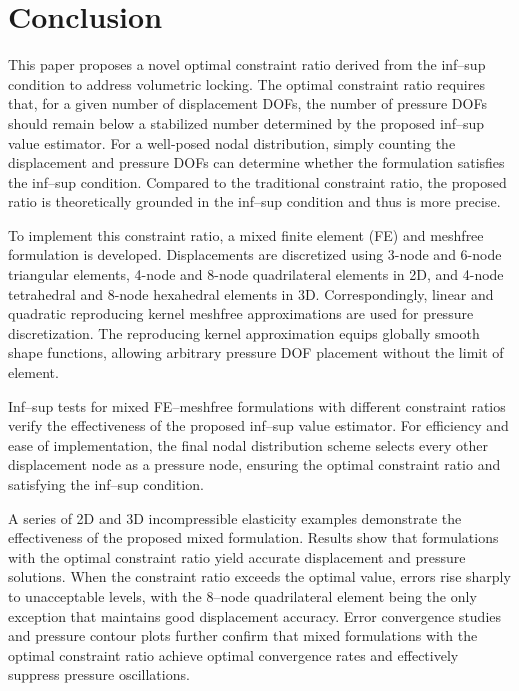 \section{Conclusion}

This paper proposes a novel optimal constraint ratio derived from the inf--sup condition to address volumetric locking. The optimal constraint ratio requires that, for a given number of displacement DOFs, the number of pressure DOFs should remain below a stabilized number determined by the proposed inf--sup value estimator. For a well-posed nodal distribution, simply counting the displacement and pressure DOFs can determine whether the formulation satisfies the inf--sup condition. Compared to the traditional constraint ratio, the proposed ratio is theoretically grounded in the inf--sup condition and thus is more precise\DIFaddbegin {}\DIFaddend .

To implement this constraint ratio, a mixed finite element (FE) and meshfree formulation is developed. Displacements are discretized using 3-node and 6-node triangular elements, 4-node and 8-node quadrilateral elements in 2D, and 4-node tetrahedral and 8-node hexahedral elements in 3D. Correspondingly, linear and quadratic reproducing kernel meshfree approximations are used for pressure discretization. The reproducing kernel approximation equips globally smooth shape functions, allowing arbitrary pressure DOF placement without the limit of element\DIFaddbegin {}\DIFaddend .

Inf--sup tests for mixed FE--meshfree formulations with different constraint ratios verify the effectiveness of the proposed inf--sup value estimator. For efficiency and ease of implementation, the final nodal distribution scheme selects every other displacement node as a pressure node, ensuring the optimal constraint ratio and satisfying the inf--sup condition.

A series of 2D and 3D incompressible elasticity examples demonstrate the effectiveness of the proposed mixed formulation. Results show that formulations with the optimal constraint ratio yield accurate displacement and pressure solutions. When the constraint ratio exceeds the optimal value, errors rise sharply to unacceptable levels, with the 8--node quadrilateral element being the only exception that maintains good displacement accuracy. Error convergence studies and pressure contour plots further confirm that mixed formulations with the optimal constraint ratio achieve optimal convergence rates and effectively suppress pressure oscillations.
